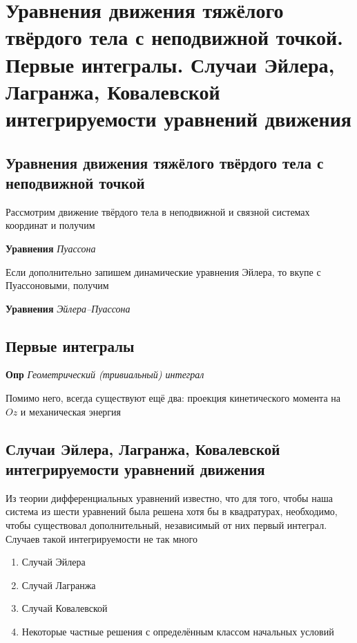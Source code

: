 \documentclass[a4paper, 14pt]{article}
\begin{document}
    \section{Уравнения движения тяжёлого твёрдого тела с неподвижной точкой.
    Первые интегралы.
    Случаи Эйлера, Лагранжа, Ковалевской интегрируемости уравнений движения}
    
    \subsection{Уравнения движения тяжёлого твёрдого тела с неподвижной точкой}
    
    Рассмотрим движение твёрдого тела в неподвижной и связной системах координат и получим
    
    \textbf{Уравнения} \textit{Пуассона}
    
    Если дополнительно запишем динамические уравнения Эйлера, то вкупе с Пуассоновыми, получим
    
    \textbf{Уравнения} \textit{Эйлера--Пуассона}
    
    \subsection{Первые интегралы}
    
    \textbf{Опр} \textit{Геометрический (тривиальный) интеграл}
    
    Помимо него, всегда существуют ещё два: проекция кинетического момента на $Oz$ и механическая энергия
    
    \subsection{Случаи Эйлера, Лагранжа, Ковалевской интегрируемости уравнений движения}
    
    Из теории дифференциальных уравнений известно, что для того, чтобы наша система из шести уравнений была решена
    хотя бы в квадратурах, необходимо, чтобы существовал дополнительный, независимый от них первый интеграл.
    Случаев такой интегрируемости не так много
    
    \begin{enumerate}
        \item Случай Эйлера
        \item Случай Лагранжа
        \item Случай Ковалевской
        \item Некоторые частные решения с определённым классом начальных условий
    \end{enumerate}
    
\end{document}
